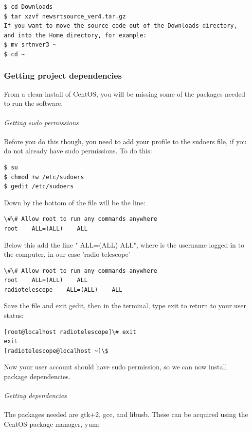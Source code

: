 \documentclass[11pt]{article} %
\begin{document}
\begin{verbatim}
$ cd Downloads
$ tar xzvf newsrtsource_ver4.tar.gz
If you want to move the source code out of the Downloads directory, and into the Home directory, for example:
$ mv srtnver3 ~
$ cd ~
\end{verbatim}

\subsubsection{Getting project dependencies}
From a clean install of CentOS, you will be missing some of the packages needed to run the software.
\\ \\
\emph{Getting sudo permissions} \\ \\
Before you do this though, you need to add your profile to the sudoers file, if you do not already have sudo permissions. To do this:

\begin{verbatim}
$ su
$ chmod +w /etc/sudoers
$ gedit /etc/sudoers
\end{verbatim}

Down by the bottom of the file will be the line:

\begin{verbatim}
\#\# Allow root to run any commands anywhere
root    ALL=(ALL)    ALL
\end{verbatim}

Below this add the line " ALL=(ALL) ALL", where is the username logged in to the computer, in our case 'radio telescope'

\begin{verbatim}
\#\# Allow root to run any commands anywhere
root    ALL=(ALL)    ALL
radiotelescope    ALL=(ALL)    ALL
\end{verbatim}

Save the file and exit gedit, then in the terminal, type exit to return to your user status:

\begin{verbatim}
[root@localhost radiotelescope]\# exit
exit
[radiotelescope@localhost ~]\$
\end{verbatim}

Now your user account should have sudo permission, so we can now install package dependencies.
\\ \\
\emph{Getting dependencies}
\\ \\
The packages needed are gtk+2, gcc, and libusb. These can be acquired using the CentOS package manager, yum:
\end{document}
